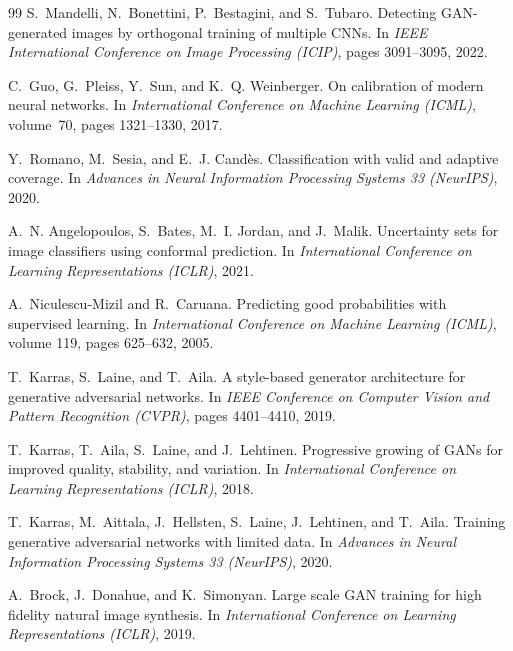 \documentclass[12pt,a4paper]{book}
\theoremstyle{definition}
\theoremstyle{remark}
\begin{document}
\begin{thebibliography}{99}
S.~Mandelli, N.~Bonettini, P.~Bestagini, and S.~Tubaro.
\newblock Detecting GAN-generated images by orthogonal training of multiple CNNs.
\newblock In \emph{IEEE International Conference on Image Processing (ICIP)}, pages 3091--3095, 2022.

C.~Guo, G.~Pleiss, Y.~Sun, and K.~Q. Weinberger.
\newblock On calibration of modern neural networks.
\newblock In \emph{International Conference on Machine Learning (ICML)}, volume~70, pages 1321--1330, 2017.

Y.~Romano, M.~Sesia, and E.~J. Cand\`{e}s.
\newblock Classification with valid and adaptive coverage.
\newblock In \emph{Advances in Neural Information Processing Systems 33 (NeurIPS)}, 2020.

A.~N. Angelopoulos, S.~Bates, M.~I. Jordan, and J.~Malik.
\newblock Uncertainty sets for image classifiers using conformal prediction.
\newblock In \emph{International Conference on Learning Representations (ICLR)}, 2021.

A.~Niculescu-Mizil and R.~Caruana.
\newblock Predicting good probabilities with supervised learning.
\newblock In \emph{International Conference on Machine Learning (ICML)}, volume 119, pages 625--632, 2005.

T.~Karras, S.~Laine, and T.~Aila.
\newblock A style-based generator architecture for generative adversarial networks.
\newblock In \emph{IEEE Conference on Computer Vision and Pattern Recognition (CVPR)}, pages 4401--4410, 2019.

T.~Karras, T.~Aila, S.~Laine, and J.~Lehtinen.
\newblock Progressive growing of GANs for improved quality, stability, and variation.
\newblock In \emph{International Conference on Learning Representations (ICLR)}, 2018.

T.~Karras, M.~Aittala, J.~Hellsten, S.~Laine, J.~Lehtinen, and T.~Aila.
\newblock Training generative adversarial networks with limited data.
\newblock In \emph{Advances in Neural Information Processing Systems 33 (NeurIPS)}, 2020.

A.~Brock, J.~Donahue, and K.~Simonyan.
\newblock Large scale GAN training for high fidelity natural image synthesis.
\newblock In \emph{International Conference on Learning Representations (ICLR)}, 2019.


\end{thebibliography}
\end{document}
